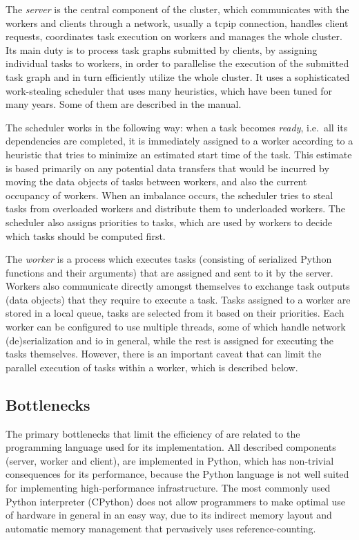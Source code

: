 The \emph{server} is the central component of the cluster, which communicates with
the workers and clients through a network, usually a \gls{tcpip} connection,
handles client requests, coordinates task execution on workers and manages the whole
\dask{} cluster. Its main duty is to process task graphs submitted by clients,
by assigning individual tasks to workers, in order to parallelise the execution of the submitted
task graph and in turn efficiently utilize the whole cluster. It uses a sophisticated work-stealing
scheduler that uses many heuristics, which have been tuned for many years. Some of them are
described in the \dask{} manual.

The scheduler works in the following way: when a task becomes \emph{ready}, i.e.\
all its dependencies are completed, it is immediately assigned to a worker according to a heuristic
that tries to minimize an estimated start time of the task. This estimate is based primarily on any
potential data transfers that would be incurred by moving the data objects of tasks between
workers, and also the current occupancy of workers. When an imbalance occurs, the scheduler tries
to steal tasks from overloaded workers and distribute them to underloaded workers. The scheduler
also assigns priorities to tasks, which are used by workers to decide which tasks should be
computed first.

The \emph{worker} is a process which executes tasks (consisting of serialized Python
functions and their arguments) that are assigned and sent to it by the server. Workers also
communicate directly amongst themselves to exchange task outputs (data objects) that they require
to execute a task. Tasks assigned to a worker are stored in a local queue, tasks are selected from
it based on their priorities. Each worker can be configured to use multiple threads, some of which
handle network (de)serialization and \gls{io} in general, while the rest is
assigned for executing the tasks themselves. However, there is an important caveat that can limit
the parallel execution of tasks within a worker, which is described below.

\subsection*{Bottlenecks}
The primary bottlenecks that limit the efficiency of \dask{} are related to the
programming language used for its implementation. All described components (server, worker and
client), are implemented in Python, which has non-trivial consequences for its performance, because
the Python language is not well suited for implementing high-performance infrastructure. The most
commonly used Python interpreter (CPython\footnoteurl{https://github.com/python/cpython}) does not allow programmers to
make optimal use of hardware in general in an easy way, due to its indirect memory layout and
automatic memory management that pervasively uses reference-counting.

